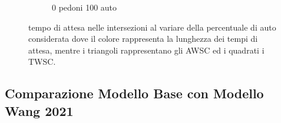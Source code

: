 \begin{figure}[ht]
\begin{subfigure}{0.45\textwidth}
        \caption{0 pedoni 100 auto}
    \end{subfigure}
    \caption{tempo di attesa nelle intersezioni al variare della percentuale di auto considerata dove il colore rappresenta la lunghezza dei tempi di attesa, mentre i triangoli rappresentano gli AWSC ed i quadrati i TWSC.}
    \label{fig:analisi-comparison-car-delay}
\end{figure}

\pagebreak

\subsection*{Comparazione Modello Base con Modello Wang 2021}

